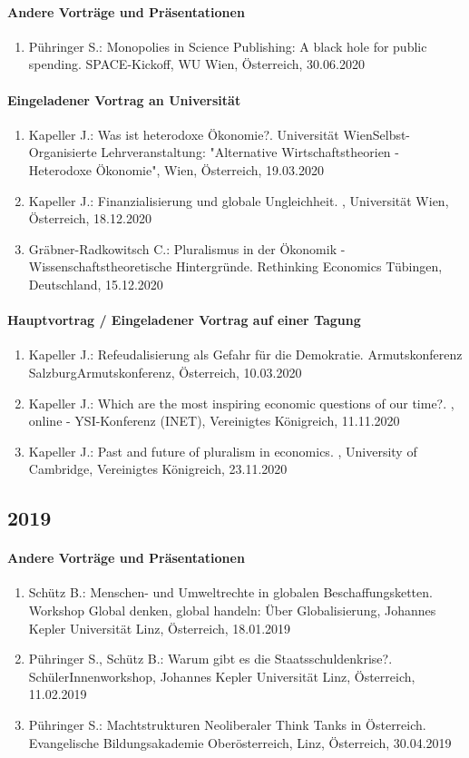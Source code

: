 \paragraph{Andere Vorträge und Präsentationen}
\begin{enumerate}
	\item Pühringer S.: Monopolies in Science Publishing: A black hole for public spending. SPACE-Kickoff, WU Wien, Österreich, 30.06.2020
\end{enumerate}
\paragraph{Eingeladener Vortrag an Universität}
\begin{enumerate}
	\item Kapeller J.: Was ist heterodoxe Ökonomie?. Universität WienSelbst-Organisierte Lehrveranstaltung: "Alternative Wirtschaftstheorien - Heterodoxe Ökonomie", Wien, Österreich, 19.03.2020
	\item Kapeller J.: Finanzialisierung und globale Ungleichheit. , Universität Wien, Österreich, 18.12.2020
	\item Gräbner-Radkowitsch C.: Pluralismus in der Ökonomik - Wissenschaftstheoretische Hintergründe. Rethinking Economics Tübingen, Deutschland, 15.12.2020
\end{enumerate}
\paragraph{Hauptvortrag / Eingeladener Vortrag auf einer Tagung}
\begin{enumerate}
	\item Kapeller J.: Refeudalisierung als Gefahr für die Demokratie. Armutskonferenz SalzburgArmutskonferenz, Österreich, 10.03.2020
	\item Kapeller J.: Which are the most inspiring economic questions of our time?. , online - YSI-Konferenz (INET), Vereinigtes Königreich, 11.11.2020
	\item Kapeller J.: Past and future of pluralism in economics. , University of Cambridge, Vereinigtes Königreich, 23.11.2020
\end{enumerate}
\subsection*{2019}
\paragraph{Andere Vorträge und Präsentationen}
\begin{enumerate}
	\item Schütz B.: Menschen- und Umweltrechte in globalen Beschaffungsketten. Workshop Global denken, global handeln: Über Globalisierung, Johannes Kepler Universität Linz, Österreich, 18.01.2019
	\item Pühringer S., Schütz B.: Warum gibt es die Staatsschuldenkrise?. SchülerInnenworkshop, Johannes Kepler Universität Linz, Österreich, 11.02.2019
	\item Pühringer S.: Machtstrukturen Neoliberaler Think Tanks in Österreich. Evangelische Bildungsakademie Oberösterreich, Linz, Österreich, 30.04.2019
\end{enumerate}
